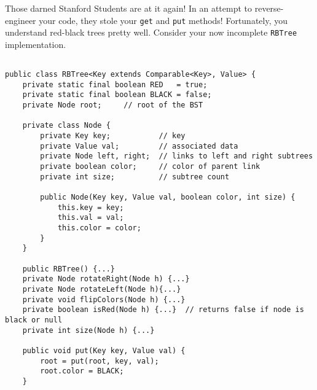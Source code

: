 \question Those darned Stanford Students are at it again! In an attempt to reverse-engineer your code, they stole your \lstinline$get$ and \lstinline$put$ methods! Fortunately, you understand red-black trees pretty well. Consider your now incomplete \lstinline$RBTree$ implementation.
\begin{lstlisting}

public class RBTree<Key extends Comparable<Key>, Value> {
    private static final boolean RED   = true;
    private static final boolean BLACK = false;
    private Node root;     // root of the BST

    private class Node {
        private Key key;           // key
        private Value val;         // associated data
        private Node left, right;  // links to left and right subtrees
        private boolean color;     // color of parent link
        private int size;          // subtree count
    
        public Node(Key key, Value val, boolean color, int size) {
            this.key = key;
            this.val = val;
            this.color = color;
        }
    }
    
    public RBTree() {...}
    private Node rotateRight(Node h) {...}
    private Node rotateLeft(Node h){...}
    private void flipColors(Node h) {...}
    private boolean isRed(Node h) {...}  // returns false if node is black or null
    private int size(Node h) {...}
    
    public void put(Key key, Value val) {
        root = put(root, key, val);
        root.color = BLACK;
    }


\end{lstlisting}
\newpage

